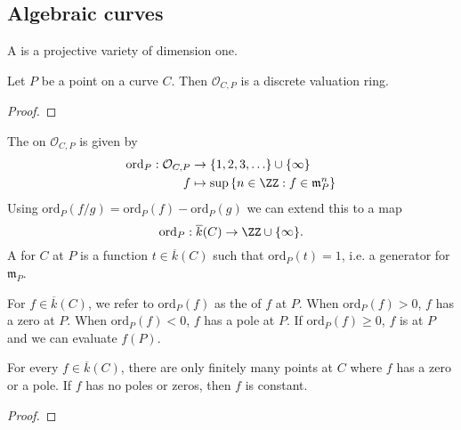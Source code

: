 \subsection{Algebraic curves}

\begin{definition}
    A  is a projective variety of dimension one.
\end{definition}

\begin{proposition}
    Let $P$ be a point on a curve $C$. Then $\mathcal{O}_{C, P}$ is a discrete valuation ring.
\end{proposition}
\begin{proof}
\end{proof}

\begin{definition}
    The  on $\mathcal{O}_{C, P}$ is given by
    \begin{align*}
        \text{ord}_P : \mathcal{O}_{C, P} &\to \{ 1, 2, 3, \ldots \} \cup \{ \infty \} \\
        f &\mapsto \sup \left\{ n \in \ZZ : f \in \mathfrak{m}_P^n \right\}
    \end{align*}
    Using $\text{ord}_P(f / g) = \text{ord}_P(f) - \text{ord}_P(g)$  we can extend this to a map
    \[ \text{ord}_P : \overline{k}(C) \to \ZZ \cup \{ \infty \} . \]
    A  for $C$ at $P$ is a function $t \in \overline{k}(C)$ such that $\text{ord}_P(t) = 1$, i.e. a generator for $\mathfrak{m}_P$.
    
    For $f \in \overline{k}(C)$, we refer to $\text{ord}_P(f)$ as the  of $f$ at $P$. When $\text{ord}_P(f) > 0$, $f$ has a zero at $P$. When $\text{ord}_P(f) < 0$, $f$ has a pole at $P$. If $\text{ord}_P(f) \ge 0$, $f$ is  at $P$ and we can evaluate $f(P)$.
\end{definition}


\begin{proposition}
    For every $f \in \overline{k}(C)$, there are only finitely many points at $C$ where $f$ has a zero or a pole. If $f$ has no poles or zeros, then $f$ is constant.
\end{proposition}

\begin{proof}
\end{proof}

